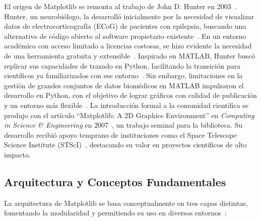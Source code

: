 El origen de Matplotlib se remonta al trabajo de John D. Hunter en 2003~\cite{MatplotlibDevTeamMain, MatplotlibDevTeamHistory}. Hunter, un neurobiólogo, la desarrolló inicialmente por la necesidad de visualizar datos de electrocorticografía (ECoG) de pacientes con epilepsia, buscando una alternativa de código abierto al software propietario existente~\cite{Jones2012Matplotlib}. En un entorno académico con acceso limitado a licencias costosas, se hizo evidente la necesidad de una herramienta gratuita y extensible~\cite{Jones2012Matplotlib}. Inspirado en MATLAB, Hunter buscó replicar sus capacidades de trazado en Python, facilitando la transición para científicos ya familiarizados con ese entorno~\cite{ActiveStateMatplotlib, MatplotlibDevTeamHistory}. Sin embargo, limitaciones en la gestión de grandes conjuntos de datos biomédicos en MATLAB impulsaron el desarrollo en Python, con el objetivo de lograr gráficos con calidad de publicación y un entorno más flexible~\cite{MatplotlibDevTeamHistory}. La introducción formal a la comunidad científica se produjo con el artículo ``Matplotlib: A 2D Graphics Environment'' en \textit{Computing in Science \& Engineering} en 2007~\cite{Hunter2007}, un trabajo seminal para la biblioteca. Su desarrollo recibió apoyo temprano de instituciones como el Space Telescope Science Institute (STScI)~\cite{desosa2021}, destacando su valor en proyectos científicos de alto impacto.

\subsection{Arquitectura y Conceptos Fundamentales}%
\label{subsec:arquitectura}

La arquitectura de Matplotlib se basa conceptualmente en tres capas distintas, fomentando la modularidad y permitiendo su uso en diversos entornos~\cite{Jones2012Matplotlib, MatplotlibDevTeamArchitectureYT}:

